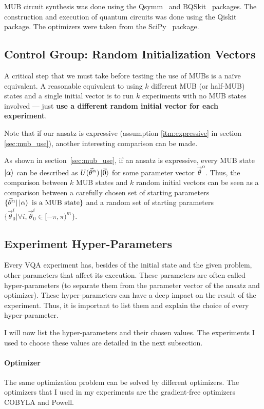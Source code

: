 \documentclass[a4paper,12pt]{article}
\newcommand{\thetas}{\vec{\theta}}
\begin{document}
MUB circuit synthesis was done using the Qsymm~\cite{qsymm} and BQSkit~\cite{bqskit} packages.
The construction and execution of quantum circuits was done using the Qiskit~\cite{qiskit} package.
The optimizers were taken from the SciPy~\cite{scipy} package.

\subsection{Control Group: Random Initialization Vectors} \label{meth:random_thetas}
A critical step that we must take before testing the use of MUBs is a na{\"i}ve equivalent.
A reasonable equivalent to using $k$ different MUB (or half-MUB) states and a single initial vector is to run $k$ experiments with no MUB states involved --- just \textbf{use a different random initial vector for each experiment}.

Note that if our ansatz is expressive (assumption \ref{itm:expressive} in section \ref{sec:mub_use}), another interesting comparison can be made.

As shown in section~\ref{sec:mub_use}, if an ansatz is expressive, every MUB state $\ket{\alpha}$ can be described as $U(\thetas^\alpha)\ket{\vec{0}}$ for some parameter vector $\thetas^\alpha$.
Thus, the comparison between $k$ MUB states and $k$ random initial vectors can be seen as a comparison between a carefully chosen set of starting parameters $\{\thetas^{\alpha} | \ket{\alpha} \textrm{ is a MUB state}\}$ and a random set of starting parameters $\{\thetas_0^i | \forall i, \thetas_{0}^{i} \in [-\pi, \pi)^m\}$.

\subsection{Experiment Hyper-Parameters} \label{subsec:hyperparams}
Every VQA experiment has, besides of the initial state and the given problem, other parameters that affect its execution.
These parameters are often called hyper-parameters (to separate them from the parameter vector of the ansatz and optimizer).
These hyper-parameters can have a deep impact on the result of the experiment.
Thus, it is important to list them and explain the choice of every hyper-parameter.

I will now list the hyper-parameters and their chosen values.
The experiments I used to choose these values are detailed in the next subsection.

\paragraph*{Optimizer}
The same optimization problem can be solved by different optimizers.
The optimizers that I used in my experiments are the gradient-free optimizers COBYLA and Powell.
\end{document}
